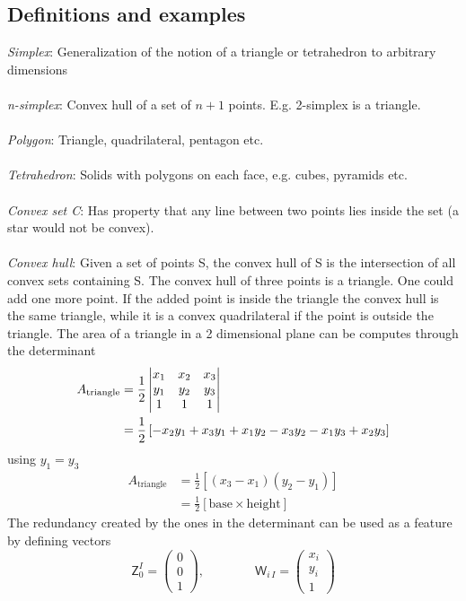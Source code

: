 \documentclass[a4paper,12pt]{article}
\begin{document}
\subsection{Definitions and examples}
\textit{Simplex}: Generalization of the notion of a triangle or tetrahedron to arbitrary dimensions
\\\\
\textit{n-simplex}: Convex hull of a set of $n+1$ points. E.g. 2-simplex is a triangle.
\\\\
\textit{Polygon}: Triangle, quadrilateral, pentagon etc.
\\\\
\textit{Tetrahedron}: Solids with polygons on each face, e.g. cubes, pyramids etc. 
\\\\
\textit{Convex set C}: Has property that any line between two points lies inside the set (a star would not be convex). 
\\\\
\textit{Convex hull}: Given a set of points S, the convex hull of S is the intersection of all convex sets containing S. The convex hull of three points is a triangle. One could add one more point. If the added point is inside the triangle the convex hull is the same triangle, while it is a convex quadrilateral if the point is outside the triangle.
\newpage
The area of a triangle in a 2 dimensional plane can be computes through the determinant
\begin{equation}
\begin{aligned}
A_{\text{triangle}}&=\frac{1}{2}
\mdet{x_1 & x_2 & x_3\\ y_1 & y_2 & y_3 \\ 1 & 1 & 1}
\\
&=\frac{1}{2}
\left[-x_2 y_1 + x_3 y_1 + x_1 y_2 - x_3 y_2 - x_1 y_3 + x_2 y_3\right]
\end{aligned}
\end{equation}
using $y_1=y_3$
\begin{equation}
	\begin{aligned}
		A_{\text{triangle}}
		&=\frac{1}{2}
		\left[(x_3 - x_1) (y_2 - y_1)\right]\\
		&=\frac{1}{2}
		\left[\text{base} \times \text{height}\right]
	\end{aligned}
\end{equation}
The redundancy created by the ones in the determinant can be used as a feature by defining vectors
\begin{equation}
	\mathsf{Z}_0^I
	=
	\begin{pmatrix}
	0\\0\\1
\end{pmatrix},\qquad\qquad	\mathsf{W}_{i\,I}
=
\begin{pmatrix}
x_i\\y_i\\1
\end{pmatrix}
\end{equation}
\end{document}
